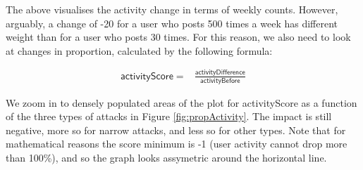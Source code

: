 \documentclass[10pt,]{scrartcl}
\begin{document}
The above visualises the activity change in terms of weekly counts.
However, arguably, a change of -20 for a user who posts 500 times a week
has different weight than for a user who posts 30 times. For this
reason, we also need to look at changes in proportion, calculated by the
following formula:

\begin{align}
\mathsf{activityScore} = & \frac{\mathsf{activityDifference}}{\mathsf{activityBefore}}
\end{align}

We zoom in to densely populated areas of the plot for
\textsf{activityScore} as a function of the three types of attacks in
Figure \ref{fig:propActivity}. The impact is still negative, more so for
\textsf{narrow} attacks, and less so for other types. Note that for
mathematical reasons the score minimum is -1 (user activity cannot drop
more than 100\%), and so the graph looks assymetric around the
horizontal line.
\end{document}
